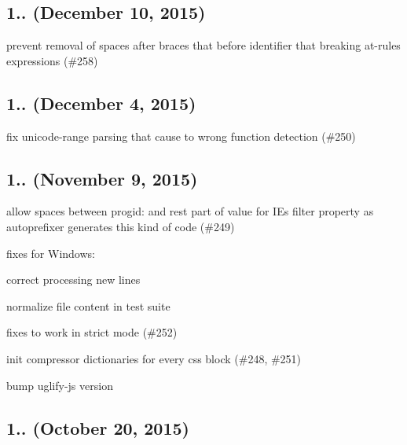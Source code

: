 \subsection*{1.. (December 10, 2015)}


\begin{DoxyItemize}
\item prevent removal of spaces after braces that before identifier that breaking at-\/rules expressions (\#258)
\end{DoxyItemize}

\subsection*{1.. (December 4, 2015)}


\begin{DoxyItemize}
\item fix unicode-\/range parsing that cause to wrong function detection (\#250)
\end{DoxyItemize}

\subsection*{1.. (November 9, 2015)}


\begin{DoxyItemize}
\item allow spaces between {\ttfamily progid\+:} and rest part of value for IE\textquotesingle{}s {\ttfamily filter} property as {\ttfamily autoprefixer} generates this kind of code (\#249)
\item fixes for Windows\+:
\begin{DoxyItemize}
\item correct processing new lines
\item normalize file content in test suite
\end{DoxyItemize}
\item fixes to work in strict mode (\#252)
\item init compressor dictionaries for every css block (\#248, \#251)
\item bump uglify-\/js version
\end{DoxyItemize}

\subsection*{1.. (October 20, 2015)}


